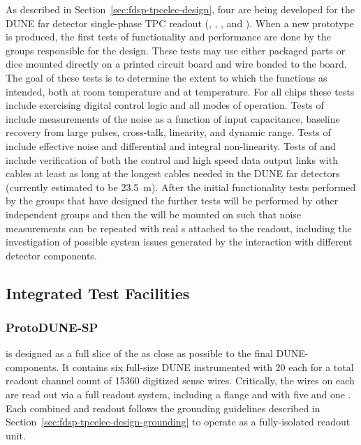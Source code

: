 As described in Section~\ref{sec:fdsp-tpcelec-design}, four  
are being developed for the DUNE far detector single-phase TPC readout 
(, , , and ). 
When a new prototype  is produced, the first tests of 
 functionality and performance are done by the groups 
responsible for the  design. These tests may use either 
packaged parts or dice mounted directly on a printed circuit board 
and wire bonded to the board.  The goal of these tests is to determine 
the extent to which the  functions as intended, both at room 
temperature and at \lntwo temperature.  For all chips these tests 
include exercising digital control logic and all modes of operation. Tests 
of   include measurements of the noise as a function 
of input capacitance, baseline recovery from large pulses, cross-talk, linearity, 
and dynamic range. Tests of  include effective noise and 
differential and integral non-linearity. Tests of  and  
include verification of both the control and high speed data output links with 
cables at least as long at the longest cables needed in the DUNE far detectors 
(currently estimated to be \SI{23.5}{m}). After the initial functionality
tests performed by the groups that have designed the  further
tests will be performed by other independent groups and then the 
will be mounted on  such that noise measurements can be repeated
with real s attached to the readout, including the investigation
of possible system issues generated by the interaction with different 
detector components.

\subsection{Integrated Test Facilities}
\label{sec:fdsp-tpcelec-qa-facilities}

\subsubsection{ProtoDUNE-SP}
\label{sec:fdsp-tpcelec-qa-facilities-pdune}

 is designed as a full slice of the  as close as 
possible to the final DUNE-\single components. It contains six full-size 
DUNE  instrumented with \num{20}  each for a 
total readout channel count of \num{15360} digitized sense wires. Critically, 
the wires on each  are read out via a full  readout 
system, including a  flange and  with five  
and one . Each combined  and  readout follows 
the grounding guidelines described in Section~\ref{sec:fdsp-tpcelec-design-grounding} 
to operate as a fully-isolated readout unit.

